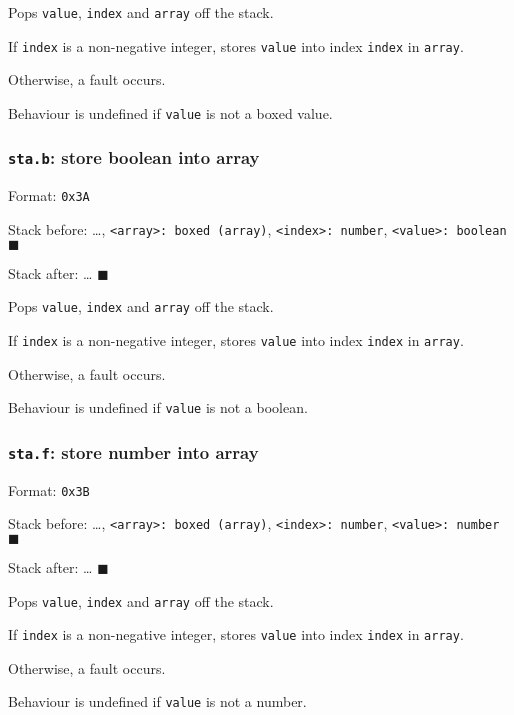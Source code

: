 Pops \texttt{value}, \texttt{index} and \texttt{array} off the stack.

If \texttt{index} is a non-negative integer, stores \texttt{value} into
index \texttt{index} in \texttt{array}.

Otherwise, a fault occurs.

Behaviour is undefined if \texttt{value} is not a boxed value.

\subsubsection{\texorpdfstring{\texttt{sta.b}: store boolean into
array}{sta.b: store boolean into array}}

Format: \texttt{0x3A}

Stack before: \ldots,
\texttt{\textless{}array\textgreater{}:\ boxed\ (array)},
\texttt{\textless{}index\textgreater{}:\ number},
\texttt{\textless{}value\textgreater{}:\ boolean} \(\blacksquare\)

Stack after: \ldots{} \(\blacksquare\)

Pops \texttt{value}, \texttt{index} and \texttt{array} off the stack.

If \texttt{index} is a non-negative integer, stores \texttt{value} into
index \texttt{index} in \texttt{array}.

Otherwise, a fault occurs.

Behaviour is undefined if \texttt{value} is not a boolean.

\subsubsection{\texorpdfstring{\texttt{sta.f}: store number into
array}{sta.f: store number into array}}

Format: \texttt{0x3B}

Stack before: \ldots,
\texttt{\textless{}array\textgreater{}:\ boxed\ (array)},
\texttt{\textless{}index\textgreater{}:\ number},
\texttt{\textless{}value\textgreater{}:\ number} \(\blacksquare\)

Stack after: \ldots{} \(\blacksquare\)

Pops \texttt{value}, \texttt{index} and \texttt{array} off the stack.

If \texttt{index} is a non-negative integer, stores \texttt{value} into
index \texttt{index} in \texttt{array}.

Otherwise, a fault occurs.

Behaviour is undefined if \texttt{value} is not a number.

